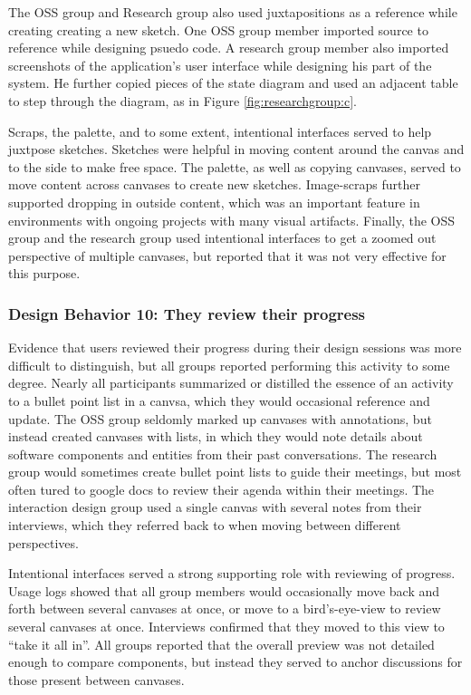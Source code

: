 The OSS group and Research group also used juxtapositions as a reference while creating creating a new sketch. One OSS group member imported source to reference while designing psuedo code. A research group member also imported screenshots of the application's user interface while designing his part of the system. He further copied pieces of the state diagram and used an adjacent table to step through the diagram, as in Figure \ref{fig:researchgroup:c}.

Scraps, the palette, and to some extent, intentional interfaces served to help juxtpose sketches. Sketches were helpful in moving content around the canvas and to the side to make free space. The palette, as well as copying canvases, served to move content across canvases to create new sketches. Image-scraps further supported dropping in outside content, which was an important feature in environments with ongoing projects with many visual artifacts. Finally, the OSS group and the research group used intentional interfaces to get a zoomed out perspective of multiple canvases, but reported that it was not very effective for this purpose.

\subsubsection{Design Behavior 10: They review their progress}

Evidence that users reviewed their progress during their design sessions was more difficult to distinguish, but all groups reported performing this activity to some degree. Nearly all participants summarized or distilled the essence of an activity to a bullet point list in a canvsa, which they would occasional reference and update. The OSS group seldomly marked up canvases with annotations, but instead created canvases with lists, in which they would note details about software components and entities from their past conversations. The research group would sometimes create bullet point lists to guide their meetings, but most often tured to google docs to review their agenda within their meetings. The interaction design group used a single canvas with several notes from their interviews, which they referred back to when moving between different perspectives. 

Intentional interfaces served a strong supporting role with reviewing of progress. Usage logs showed that all group members would occasionally move back and forth between several canvases at once, or move to a bird's-eye-view to review several canvases at once. Interviews confirmed that they moved to this view to ``take it all in''. All groups reported that the overall preview was not detailed enough to compare components, but instead they served to anchor discussions for those present between canvases.


